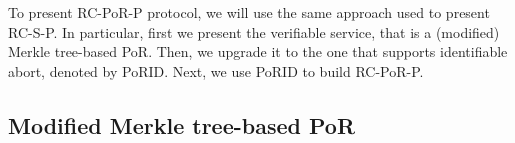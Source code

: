 %


To present RC-PoR-P protocol, we will use the same approach  used to present RC-S-P. In particular, first we present the verifiable service, that is a (modified) Merkle tree-based PoR. Then, we upgrade it to the one that supports  identifiable abort, denoted by PoRID. Next,   we use PoRID to build RC-PoR-P. 

\subsection{Modified Merkle tree-based PoR}\label{protocol::PoR}

